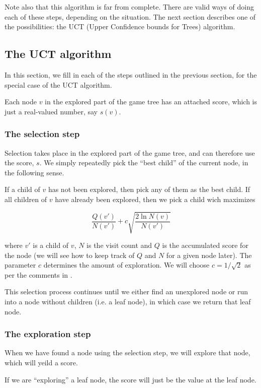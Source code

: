 Note also that this algorithm is far from complete. There are valid ways of doing each of these steps, depending on the situation.
The next section describes one of the possibilities: the UCT (Upper Confidence bounds for Trees) algorithm.


\subsection{The UCT algorithm}

In this section, we fill in each of the steps outlined in the previous section, for the special case of the UCT algorithm.


Each node $v$ in the explored part of the game tree has an attached score, which is just a real-valued number, say $s(v)$.


\subsubsection{The selection step}

Selection takes place in the explored part of the game tree, and can therefore use the score, $s$.
We simply repeatedly pick the ``best child'' of the current node, in the following sense.

If a child of $v$ has not been explored, then pick any of them as the best child.
If all children of $v$ have already been explored, then we pick a child wich maximizes

\[
\frac{Q(v')}{N(v')} + c\sqrt{\frac{2\ln{N(v)}}{N(v')}}
\] 


where $v'$ is a child of $v$, $N$ is the visit count and $Q$ is the accumulated score for the node (we will see how to keep track of $Q$ and $N$ for a given node later).
The parameter $c$ determines the amount of exploration. We will choose $c = 1 / \sqrt 2$ as per the comments in \citep[p. 9]{mcts_survey12}.

This selection process continues until we either find an unexplored node or run into a node without children (i.e. a leaf node), in which case we return that leaf node.

\subsubsection{The exploration step}

When we have found a node using the selection step, we will explore that node, which will yeild a score.

If we are ``exploring'' a leaf node, the score will just be the value at the leaf node.

